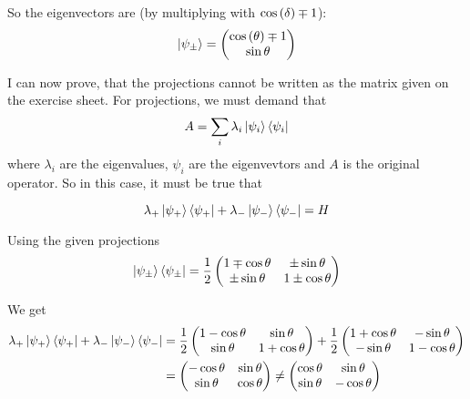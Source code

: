 \documentclass[a4paper,german,12pt,smallheadings]{scrartcl}
\begin{document}
\begin{enumerate}[a)]
    So the eigenvectors are (by multiplying with $\cos\del\delta \mp 1$):
    \begin{equation*}
    \ket{\psi_\pm} = \begin{pmatrix} \cos\del\theta \mp 1 \\ \sin\theta \end{pmatrix}
    \end{equation*}

    I can now prove, that the projections cannot be written as the matrix given
    on the exercise sheet. For projections, we must demand that
    \begin{align*}
      A = \sum_i \lambda_i \ket{\psi_i}\bra{\psi_i}
    \end{align*}
    where $\lambda_i$ are the eigenvalues, $\psi_i$ are the eigenvevtors and
    $A$ is the original operator. So in this case, it must be true that

    \begin{equation*}
      \lambda_+ \ket{\psi_+} \bra{\psi_+} + \lambda_- \ket{\psi_-} \bra{\psi_-} = H
    \end{equation*}

    Using the given projections
    \begin{equation*}
      \ket{\psi_\pm} \bra{\psi_\pm} = \frac{1}{2} \begin{pmatrix}
        1 \mp \cos \theta & \pm \sin \theta \\
        \pm \sin \theta & 1 \pm \cos \theta
      \end{pmatrix}
    \end{equation*}

    We get
    \begin{align*}
      \lambda_+ \ket{\psi_+} \bra{\psi_+} + \lambda_- \ket{\psi_-} \bra{\psi_-} &=
      \frac{1}{2} \begin{pmatrix}
        1 - \cos \theta &  \sin \theta \\
         \sin \theta & 1 + \cos \theta
      \end{pmatrix}
      +
      \frac{1}{2} \begin{pmatrix}
        1 + \cos \theta &  -\sin \theta \\
         -\sin \theta & 1 - \cos \theta
      \end{pmatrix}\\
      &=
      \begin{pmatrix}
        -\cos \theta &  \sin \theta \\
         \sin \theta &  \cos \theta
      \end{pmatrix}
      \neq
      \begin{pmatrix}
        \cos \theta &  \sin \theta \\
         \sin \theta &  -\cos \theta
      \end{pmatrix}
    \end{align*}


\end{enumerate}
\end{document}
